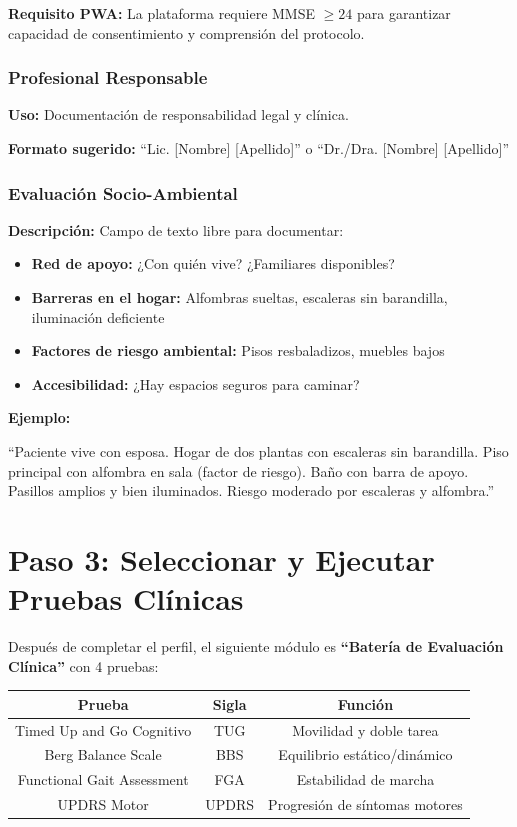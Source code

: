 \documentclass[12pt,a4paper,spanish,oneside]{book}
\begin{document}
\textbf{Requisito PWA:} La plataforma requiere MMSE $\geq 24$ para garantizar capacidad de consentimiento y comprensión del protocolo.

\subsubsection{Profesional Responsable}

\textbf{Uso:} Documentación de responsabilidad legal y clínica.

\textbf{Formato sugerido:} ``Lic. [Nombre] [Apellido]'' o ``Dr./Dra. [Nombre] [Apellido]''

\subsubsection{Evaluación Socio-Ambiental}

\textbf{Descripción:} Campo de texto libre para documentar:

\begin{itemize}
  \item \textbf{Red de apoyo:} ¿Con quién vive? ¿Familiares disponibles?
  \item \textbf{Barreras en el hogar:} Alfombras sueltas, escaleras sin barandilla, iluminación deficiente
  \item \textbf{Factores de riesgo ambiental:} Pisos resbaladizos, muebles bajos
  \item \textbf{Accesibilidad:} ¿Hay espacios seguros para caminar?
\end{itemize}

\textbf{Ejemplo:}
\begin{ejemplobox}
  ``Paciente vive con esposa. Hogar de dos plantas con escaleras sin barandilla. Piso principal con alfombra en sala (factor de riesgo). Baño con barra de apoyo. Pasillos amplios y bien iluminados. Riesgo moderado por escaleras y alfombra.''
\end{ejemplobox}

\section{Paso 3: Seleccionar y Ejecutar Pruebas Clínicas}

Después de completar el perfil, el siguiente módulo es \textbf{``Batería de Evaluación Clínica''} con 4 pruebas:

\begin{center}
  \begin{tabular}{|c|c|c|}
    \hline
    \textbf{Prueba} & \textbf{Sigla} & \textbf{Función} \\
    \hline
    Timed Up and Go Cognitivo & TUG & Movilidad y doble tarea \\
    \hline
    Berg Balance Scale & BBS & Equilibrio estático/dinámico \\
    \hline
    Functional Gait Assessment & FGA & Estabilidad de marcha \\
    \hline
    UPDRS Motor & UPDRS & Progresión de síntomas motores \\
    \hline
  \end{tabular}
\end{center}
\end{document}
